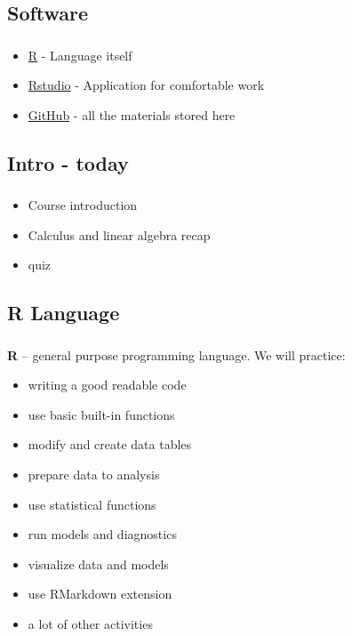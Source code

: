 \documentclass[t, 11pt]{beamer}
\begin{document}
	\subsection{Software}
	\begin{frame}\label{}
		\frametitle{\insertsection}
		\frametitle{\insertsubsection}
		\begin{itemize}
			\item \href{https://www.r-project.org/}{R} - Language itself
			\item \href{https://www.rstudio.com/products/rstudio/}{Rstudio} - Application for comfortable work
			\item \href{https://github.com/sergeychuvakin/SAS_Quantitative_Methods/}{GitHub} - all the materials stored here 
		\end{itemize}
	\end{frame}
	
	
	\subsection{Intro - today}
	\begin{frame}\label{}
		\frametitle{\insertsection}
		\frametitle{\insertsubsection}
		
		\begin{itemize}
			\item Course introduction 
			\item Calculus and linear algebra recap
			\item quiz 
		\end{itemize}
	\end{frame}	
	
	\subsection{R Language}
	\begin{frame}\label{}
		\frametitle{\insertsection}
		\frametitle{\insertsubsection}
		
		\textbf{R} -- general purpose programming language. We will practice:
		\begin{itemize}
			\item writing a good readable code
			\item use basic built-in functions 
			\item modify  and create data tables
			\item prepare data to analysis
			\item use statistical functions
			\item run models and diagnostics 
			\item visualize data and models
			\item use RMarkdown extension
			\item a lot of other activities 
		\end{itemize}	  
	\end{frame}	
	
\end{document}
